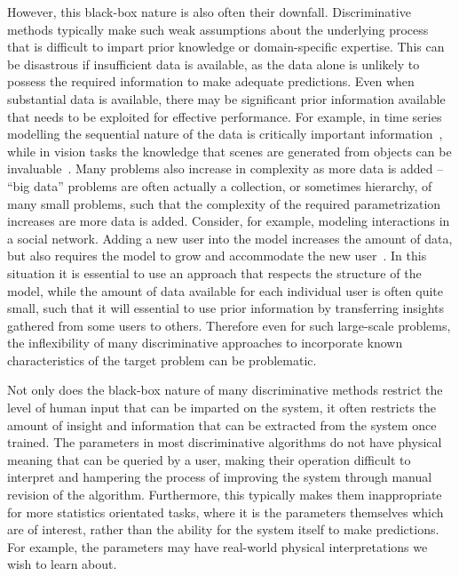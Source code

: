 However, this black-box nature is also often their downfall.  Discriminative methods typically make
such weak assumptions about the underlying process that is difficult to impart prior knowledge
or domain-specific expertise.  This can be disastrous if insufficient data is available, as the data
alone is unlikely to possess the required information to make adequate predictions.  Even when
substantial data is available, there may be significant prior information available that needs to be
exploited for effective performance.  For example, in time series modelling the sequential nature
of the data is critically important information~\citep{liu1998sequential}, while in vision tasks the 
knowledge that scenes are generated from objects can be invaluable~\citep{kulkarni2015picture}.
Many problems also increase in complexity as more data is added -- ``big data'' problems are often
actually a collection, or sometimes hierarchy, of many small problems, such that the complexity of the
required parametrization increases are more data is added.  Consider, for example, modeling interactions in
a social network.  Adding a new user into the model increases the amount of data, but also
requires the model to grow and accommodate the new user~\citep{ravasz2003hierarchical}.  In
this situation it is essential to
use an approach that respects the structure of the model, while the amount of data available
for each individual user is often quite small, such that it will essential to use prior information
by transferring insights gathered from some users to others.  Therefore even for such large-scale
problems, the inflexibility of many discriminative approaches to incorporate known characteristics
of the target problem can be problematic.

Not only does the black-box nature of many discriminative methods restrict the level of
human input that can be imparted on the system, it often restricts the amount of insight
and information that can be extracted from the system once trained.  The parameters in most discriminative
algorithms do not have physical meaning that can be queried by a user, making their operation
difficult to interpret and hampering the process of improving the system through manual
revision of the algorithm.  Furthermore, this typically makes them inappropriate for more
statistics orientated tasks, where it is the parameters themselves which are of interest, rather
than the ability for the system itself to make predictions.  For example, the parameters may
have real-world physical interpretations we wish to learn about.

